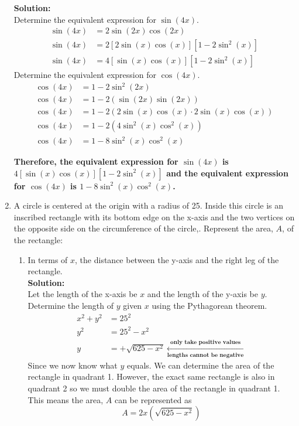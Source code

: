 \documentclass[12pt]{book}
\begin{document}
\begin{enumerate}
\textbf{Solution:}\\
Determine the equivalent expression for $\sin(4x)$.
\begin{align*}
    \sin(4x) &= 2 \sin (2x) \cos(2x)\\
    \sin(4x) &= 2\left[2\sin\left(x\right)\cos\left(x\right)\right]\left[1-2\sin^{2}\left(x\right)\right]\\
    \sin(4x) &= 4\left[\sin\left(x\right)\cos\left(x\right)\right]\left[1-2\sin^{2}\left(x\right)\right]
\end{align*}
Determine the equivalent expression for $\cos(4x)$.
\begin{align*}
    \cos(4x) &= 1-2\sin^{2}\left(2x\right) \\
    \cos(4x) &= 1-2\left(\sin\left(2x\right)\sin\left(2x\right)\right) \\
    \cos(4x) &= 1-2\left(2\sin\left(x\right)\cos\left(x\right)\cdot2\sin\left(x\right)\cos\left(x\right)\right) \\
    \cos(4x) &= 1-2\left(4\sin^{2}\left(x\right)\cos^{2}\left(x\right)\right) \\
    \cos(4x) &= 1-8\sin^{2}\left(x\right)\cos^{2}\left(x\right)
\end{align*}

\textbf{Therefore, the equivalent expression for $\sin(4x)$ is $4\left[\sin\left(x\right)\cos\left(x\right)\right]\left[1-2\sin^{2}\left(x\right)\right]$ and the equivalent expression for $\cos(4x)$ is $1-8\sin^{2}\left(x\right)\cos^{2}\left(x\right)$.}

\newpage

\item A circle is centered at the origin with a radius of 25. Inside this circle is an inscribed rectangle with its bottom edge on the x-axis and the two vertices on the opposite side on the circumference of the circle,. Represent the area, $A$, of the rectangle:

\begin{enumerate}
\item In terms of $x$, the distance between the y-axis and the right leg of the rectangle. \\

\textbf{Solution:}\\
Let the length of the x-axis be $x$ and the length of the y-axis be $y$.\\

Determine the length of $y$ given $x$ using the Pythagorean theorem.
\begin{align*}
    x^2 + y^2 &= 25^2 \\
    y^2 &= 25^2 - x^2 \\
    y &= +\sqrt{625 - x^2} \xleftarrow[\textbf{lengths cannot be negative}]{\textbf{only take positive values}}
\end{align*}
Since we now know what $y$ equals. We can determine the area of the rectangle in quadrant 1. However, the exact same rectangle is also in quadrant 2 so we must double the area of the rectangle in quadrant 1. This means the area, $A$ can be represented as
$$A = 2x(\sqrt{625-x^2})$$


\end{enumerate}
\end{enumerate}
\end{document}
